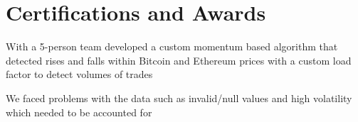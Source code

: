 \documentclass[]{resume-template}
\begin{document}
\begin{minipage}[t]{0.66\textwidth}


    \section{Certifications and Awards}\label{sec:certifications-and-awards}
    \begin{tightemize}
        \item With a  5-person team developed a custom momentum based algorithm that detected rises and falls within
        Bitcoin and Ethereum prices with a custom load factor to detect volumes of trades
        \item We faced problems with the data such as invalid/null values and high volatility which needed to be
        accounted for
    \end{tightemize}
    \sectionsep{}
    \sectionsep{}

    \sectionsep{}





\end{minipage}
\end{document}
